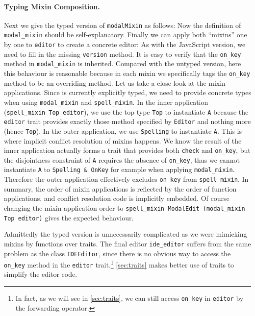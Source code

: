 \paragraph{Typing Mixin Composition.}
Next we give the typed version of \lstinline{modalMixin} as follows:
Now the definition of \lstinline{modal_mixin} should be self-explanatory.
Finally we can apply both ``mixins'' one by one to \lstinline{editor} to create
a concrete editor:
As with the JavaScript version, we need to fill in the missing
\lstinline{version} method. It is easy to verify that the \lstinline{on_key} method
in \lstinline{modal_mixin} is inherited. Compared with the untyped version,
here this behaviour is reasonable because in each mixin we specifically tags the
\lstinline{on_key} method to be an overriding method. Let us take a close look
at the mixin applications. Since \name is currently explicitly typed, we need to
provide concrete types when using \lstinline{modal_mixin} and \lstinline{spell_mixin}.
In the inner application (\lstinline{spell_mixin Top editor}), we use the top
type \lstinline{Top} to instantiate \lstinline{A} because the \lstinline{editor} trait
provides exactly those method specified by \lstinline{Editor} and nothing more
(hence \lstinline{Top}). In the outer application, we use \lstinline{Spelling}
to instantiate \lstinline{A}. This is where implicit conflict resolution of
mixins happens. We know the result of the inner application actually forms a
trait that provides both \lstinline{check} and \lstinline{on_key}, but the
disjointness constraint of \lstinline{A} requires the absence of \lstinline{on_key},
thus we cannot instantiate \lstinline{A} to \lstinline{Spelling & OnKey} for example
when applying \lstinline{modal_mixin}. Therefore the outer application effectively excludes
\lstinline{on_key} from \lstinline{spell_mixin}.
In summary, the order of mixin applications is reflected by the order
of function applications, and conflict resolution code is implicitly embedded.
Of course changing the mixin application order to \lstinline{spell_mixin ModalEdit (modal_mixin Top editor)} gives the expected behaviour.


Admittedly the typed version is unnecessarily complicated as we were
mimicking mixins by functions over traits. The final editor
\lstinline{ide_editor} suffers from the same problem as the class
\lstinline{IDEEditor}, since there is no obvious way to access the
\lstinline{on_key} method in the \lstinline{editor} trait.\footnote{In fact, as
  we will see in \cref{sec:traits}, we can still access \lstinline{on_key} in
  \lstinline{editor} by the forwarding operator.} \cref{sec:traits}
makes better use of traits to simplify the editor code.



